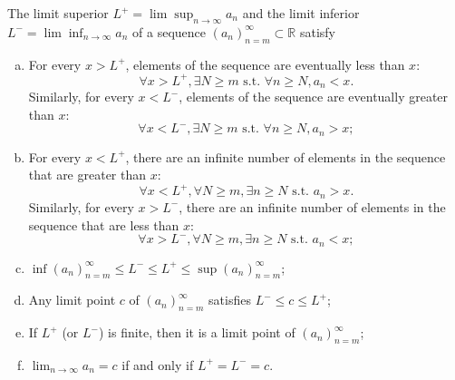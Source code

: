 \begin{lem}
  \label{lem:qualitiesAboutLimitSuperiorAndInferior}
  The limit superior $L^+=\lim\sup_{n\rightarrow\infty} a_n$
  and the limit inferior $L^-=\lim\inf_{n\rightarrow\infty} a_n$
  of a sequence $(a_n)_{n=m}^{\infty}\subset \mathbb{R}$
  satisfy
  \begin{enumerate}[(a)]
  \item For every $x>L^+$,
    elements of the sequence are eventually less than $x$:
    \begin{displaymath}
      \forall x>L^+, \exists N\ge m \text{ s.t. }
      \forall n\ge N, a_n<x.
    \end{displaymath}
    Similarly, for every $x<L^-$,
    elements of the sequence are eventually greater than $x$:
    \begin{displaymath}
      \forall x<L^-, \exists N\ge m \text{ s.t. }
      \forall n\ge N, a_n>x; 
    \end{displaymath}
  \item For every $x<L^+$,
    there are an infinite number of elements in the sequence
    that are greater than $x$:
    \begin{displaymath}
      \forall x<L^+, \forall N\ge m,
      \exists n\ge N \text{ s.t. } a_n>x.
    \end{displaymath}
    Similarly,
    for every $x>L^-$,
    there are an infinite number of elements in the sequence
    that are less than $x$:
    \begin{displaymath}
      \forall x>L^-, \forall N\ge m,
      \exists n\ge N \text{ s.t. } a_n < x; 
    \end{displaymath}
  \item $\inf(a_n)_{n=m}^{\infty}\le L^- \le L^+ \le
    \sup(a_n)_{n=m}^{\infty}$; 
  \item Any limit point $c$ of $(a_n)_{n=m}^{\infty}$
    satisfies $L^-\le c \le L^+$; 
  \item If $L^+$ (or $L^-$) is finite,
    then it is a limit point
    of $(a_n)_{n=m}^{\infty}$; 
  \item $\lim_{n\rightarrow \infty} a_n = c$
    if and only if $L^+=L^-=c$.
    
  \end{enumerate}
\end{lem}
